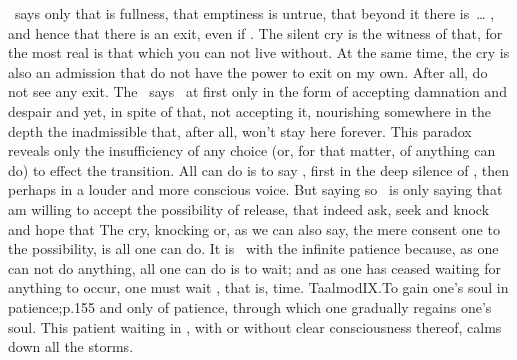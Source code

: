 \label{pre:humility}%
\Yes\ says only that  is fullness, that emptiness is untrue, that beyond it there is~\ldots
{}, and hence that there is an exit, even if . The
silent cry  is the witness of that, for the most real is that
which you can not live without. At the same time, the cry is also an admission
that  do not have the power to exit on my own. After all,  do not
see any exit. The \sch\ says \yes\ at first only in the form of accepting
damnation and despair and yet, in spite of that, not accepting it, nourishing
somewhere in the depth the inadmissible  that, after all,  won't
stay here forever. This paradox reveals only the insufficiency of any
 choice (or, for that matter, of anything  can do) to effect
the transition. All  can do is to say \Yes, first in the deep silence of
, then perhaps in a louder and more conscious voice. But saying
so \yes\ is only saying that  am willing to accept the possibility of
release, that  indeed ask, seek and knock and hope that  The cry, knocking or, as we can also say, the mere
consent  one to the possibility, is all one can do. It is \equi\ 
with the infinite patience because, as one can not do anything, all one can do
is to wait; and as one has ceased waiting for anything \co{visible} to occur, one
must wait \co{eternally}, that is, \co{above} time. \citet{[I]t is necessary
  that one has the patience to begin so, that one in truth admits, that it is a
  feat of patience}{Taalmod}{IX.To gain one's soul in patience;p.155} and only
of patience, through which one gradually regains one's soul. This patient waiting
in \co{openness}, with or without clear consciousness thereof, calms down all
the storms.


